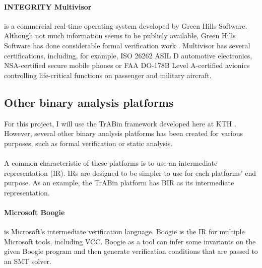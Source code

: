 \documentclass{kththesis}
\begin{document}

\paragraph{INTEGRITY Multivisor} is a commercial real-time operating system developed by Green Hills Software. Although not much information seems to be publicly available, Green Hills Software has done considerable formal verification work \cite{richards_modeling_2010}. Multivisor has several certifications, including, for example, ISO 26262 ASIL D automotive electronics, NSA-certified secure mobile phones or FAA DO-178B Level A-certified avionics controlling life-critical functions on passenger and military aircraft\footnotemark.


\subsection{Other binary analysis platforms}

For this project, I will use the TrABin framework developed here at KTH \cite{lindner_trabin:_2019}. However, several other binary analysis platforms has been created for various purposes, such as formal verification or static analysis.

\paragraph{} A common characteristic of these platforms is to use an intermediate representation (IR). IRs are designed to be simpler to use for each platforms' end purpose. As an example, the TrABin platform has BIR as its intermediate representation.

\paragraph{Microsoft Boogie} is Microsoft's intermediate verification language. Boogie is the IR for multiple Microsoft tools, including VCC. Boogie as a tool can infer some invariants on the given Boogie program and then generate verification conditions that are passed to an SMT solver\footnotemark.

\end{document}

